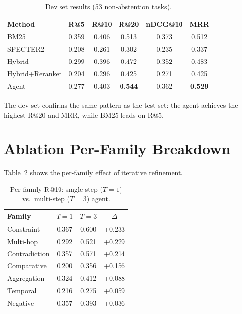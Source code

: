 \documentclass{article}
\begin{document}
\begin{table}[h]
\centering
\caption{Dev set results (53 non-abstention tasks).}
\begin{tabular}{lccccc}
\toprule
\textbf{Method} & \textbf{R@5} & \textbf{R@10} & \textbf{R@20} & \textbf{nDCG@10} & \textbf{MRR} \\
\midrule
BM25 & 0.359 & 0.406 & 0.513 & 0.373 & 0.512 \\
SPECTER2 & 0.208 & 0.261 & 0.302 & 0.235 & 0.337 \\
Hybrid & 0.299 & 0.396 & 0.472 & 0.352 & 0.483 \\
Hybrid+Reranker & 0.204 & 0.296 & 0.425 & 0.271 & 0.425 \\
Agent & 0.277 & 0.403 & \textbf{0.544} & 0.362 & \textbf{0.529} \\
\bottomrule
\end{tabular}
\label{tab:dev}
\end{table}

The dev set confirms the same pattern as the test set: the agent achieves the highest R@20 and MRR, while BM25 leads on R@5.

\section{Ablation Per-Family Breakdown}
\label{app:ablation_family}

Table~\ref{tab:ablation_family} shows the per-family effect of iterative refinement.

\begin{table}[h]
\centering
\caption{Per-family R@10: single-step ($T{=}1$) vs.\ multi-step ($T{=}3$) agent.}
\small
\begin{tabular}{lccc}
\toprule
\textbf{Family} & $T{=}1$ & $T{=}3$ & $\Delta$ \\
\midrule
Constraint & 0.367 & 0.600 & +0.233 \\
Multi-hop & 0.292 & 0.521 & +0.229 \\
Contradiction & 0.357 & 0.571 & +0.214 \\
Comparative & 0.200 & 0.356 & +0.156 \\
Aggregation & 0.324 & 0.412 & +0.088 \\
Temporal & 0.216 & 0.275 & +0.059 \\
Negative & 0.357 & 0.393 & +0.036 \\
\bottomrule
\end{tabular}
\label{tab:ablation_family}
\end{table}
\end{document}
